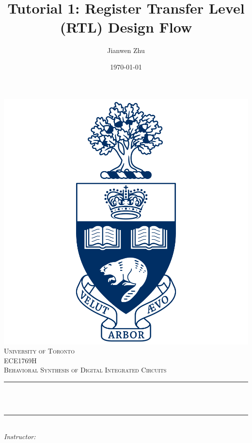 \documentclass[12pt]{article}
\title{Tutorial 1: Register Transfer Level (RTL) Design Flow}			%
\author{Jianwen Zhu}								%
\date{\today}									%
\makeatletter
\newcommand{\course} {ECE1769H}
\let\thetitle\@title
\let\theauthor\@author
\makeatother
\begin{document}

\begin{titlepage}
	\centering
    \vspace*{0.5 cm}
    \includegraphics[scale = 0.12]{UofT.png}\\[1.0 cm]	%
    \textsc{\LARGE University of Toronto}\\[2.0 cm]	%
	\textsc{\Large \course}\\[0.5 cm]				%
	\textsc{\large Behavioral Synthesis of Digital Integrated Circuits}\\[0.5 cm]				%
	\rule{\linewidth}{0.2 mm} \\[0.4 cm]
	{ \huge \bfseries \thetitle}\\
	\rule{\linewidth}{0.2 mm} \\[1.5 cm]
	
		\large
			\emph{Instructor:}\\
			\theauthor 
			
 
	\vfill
	
\end{titlepage}
\end{document}

